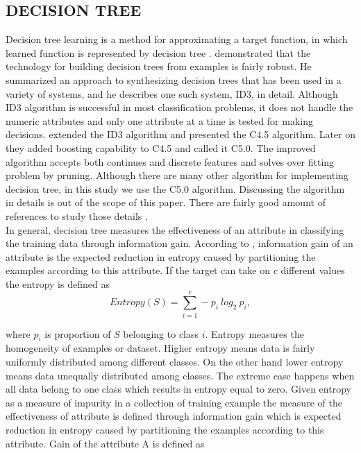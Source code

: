 \subsection{DECISION TREE} \label{dtree_methodology}

Decision tree learning is a method for approximating a target function, in which learned function is represented by decision tree \citep{Mitchell_1997_Book}. \citet{Quinlan_1986} demonstrated that the technology for building decision trees from examples is fairly robust. He summarized an approach to synthesizing decision trees that has been used in a variety of systems, and he describes one such system, ID3, in detail. Although ID3 algorithm is successful in most classification problems, it does not handle the numeric attributes and only one attribute at a time is tested for making decisions. \citet{Quinlan_1993} extended the ID3 algorithm and presented the C4.5 algorithm. Later on they added boosting capability to C4.5 and called it C5.0. The improved algorithm accepts both continues and discrete features and solves over fitting problem by pruning. Although there are many other algorithm for implementing decision tree, in this study we use the C5.0 algorithm. Discussing the algorithm in details is out of the scope of this paper. There are fairly good amount of references to study those details \citep[e.g.,][]{Mitchell_1997_Book,Quinlan_1993,Hornik_2009}.\\
In general, decision tree measures the effectiveness of an attribute in classifying the training data through information gain. According to  \citet{Mitchell_1997_Book}, information gain of an attribute is the expected reduction in entropy caused by partitioning the examples according to this attribute. If the target can take on $c$ different values the entropy is defined as
\begin{equation}
Entropy(S) = \sum_{i=1}^{c} -p_{i}\ log_2\ p_i,
\end{equation}

where $p_i$ is proportion of $S$ belonging to class $i$. Entropy measures the homogeneity of examples or dataset. Higher entropy means data is  fairly uniformly distributed among different classes. On the other hand lower entropy means data unequally distributed among classes. The extreme case happens when all data belong to one class which results in entropy equal to zero. Given entropy as a measure of impurity in a collection of training example the measure of the effectiveness of attribute is defined through information gain which is expected reduction in entropy caused by partitioning the examples according to this attribute. Gain of the attribute A is defined as 

